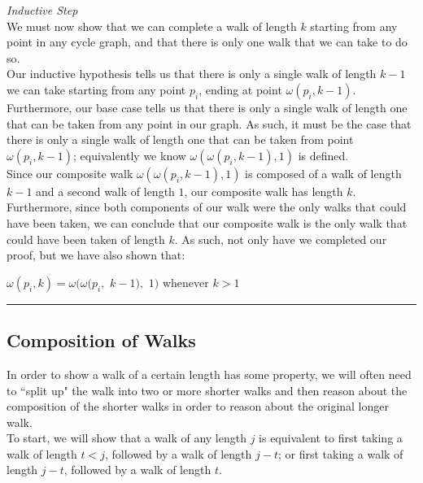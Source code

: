 \documentclass[a4paper,12pt]{article}
\begin{document}
\noindent
\textit{Inductive Step}\\
We must now show that we can complete a walk of length $k$ starting from any point in any cycle graph, and that there is only one walk that we can take to do so.\\

\noindent Our inductive hypothesis tells us that there is only a single walk of length $k - 1$ we can take starting from any point $p_i$, ending at point $\omega(p_i, k - 1)$.\\

\noindent Furthermore, our base case tells us that there is only a single walk of length one that can be taken from any point in our graph. As such, it must be the case that there is only a single walk of length one that can be taken from point $\omega(p_i, k - 1)$; equivalently we know $\omega(\omega(p_i, k - 1), 1)$ is defined.\\

\noindent Since our composite walk $\omega(\omega(p_i, k - 1), 1)$ is composed of a walk of length $k - 1$ and a second walk of length $1$, our composite walk has length $k$. Furthermore, since both components of our walk were the only walks that could have been taken, we can conclude that our composite walk is the only walk that could have been taken of length $k$. As such, not only have we completed our proof, but we have also shown that:

\begin{center}
$\omega(p_i, k) = \omega(\omega(p_i,$ $k - 1),$ $1)$ whenever $k > 1$
\end{center}

\begin{center}
\noindent\rule{8cm}{0.4pt}
\end{center} 




\subsection{Composition of Walks}

In order to show a walk of a certain length has some property, we will often need to ``split up" the walk into two or more shorter walks and then reason about the composition of the shorter walks in order to reason about the original longer walk.\\

\noindent To start, we will show that a walk of any length $j$ is equivalent to first taking a walk of length $t < j$, followed by a walk of length $j - t$; or first taking a walk of length $j - t$, followed by a walk of length $t$.\\
\end{document}
